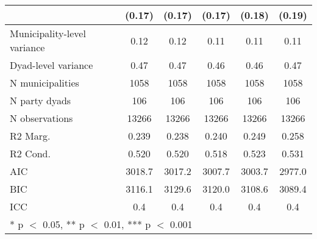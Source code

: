 \begin{tabular}[t]{lccccc}
& (\num{0.17})   & (\num{0.17})   & (\num{0.17})   & (\num{0.18})   & (\num{0.19})   \\
\midrule
Municipality-level variance             & \num{0.12}     & \num{0.12}     & \num{0.11}     & \num{0.11}     & \num{0.11}     \\
Dyad-level variance                     & \num{0.47}     & \num{0.47}     & \num{0.46}     & \num{0.46}     & \num{0.47}     \\
N municipalities                        & \num{1058}  & \num{1058}  & \num{1058}  & \num{1058}  & \num{1058}  \\
N party dyads                           & \num{106}   & \num{106}   & \num{106}   & \num{106}   & \num{106}   \\
N observations                          & \num{13266}    & \num{13266}    & \num{13266}    & \num{13266}    & \num{13266}    \\
R2 Marg.                                & \num{0.239}    & \num{0.238}    & \num{0.240}    & \num{0.249}    & \num{0.258}    \\
R2 Cond.                                & \num{0.520}    & \num{0.520}    & \num{0.518}    & \num{0.523}    & \num{0.531}    \\
AIC                                     & \num{3018.7}   & \num{3017.2}   & \num{3007.7}   & \num{3003.7}   & \num{2977.0}   \\
BIC                                     & \num{3116.1}   & \num{3129.6}   & \num{3120.0}   & \num{3108.6}   & \num{3089.4}   \\
ICC                                     & \num{0.4}      & \num{0.4}      & \num{0.4}      & \num{0.4}      & \num{0.4}      \\
\bottomrule
\multicolumn{6}{l}{\rule{0pt}{1em}* p $<$ 0.05, ** p $<$ 0.01, *** p $<$ 0.001}\\
\end{tabular}
